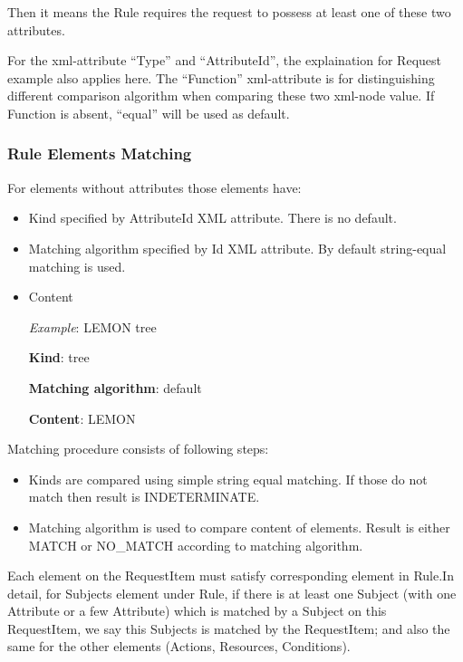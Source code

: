\documentclass{article}                            %
\begin{document}
Then it means the Rule requires the request to possess at least one of these two attributes.

For the xml-attribute ``Type'' and ``AttributeId'', the explaination for Request example also applies here.
The ``Function'' xml-attribute is for distinguishing different comparison algorithm when comparing these two xml-node value. If Function is absent, ``equal'' will be used as default.


\subsubsection{Rule Elements Matching} %
\label{subsubsec:rule_element_match}
For elements without attributes those elements have:

    \begin{itemize}
        \item Kind specified by AttributeId XML attribute. There is no default.
        \item Matching algorithm specified by Id XML attribute. By default string-equal matching is used.
        \item Content

        \textit{Example}: LEMON tree

        \textbf{Kind}: tree

        \textbf{Matching algorithm}: default

        \textbf{Content}: LEMON

    \end{itemize}

Matching procedure consists of following steps:
    \begin{itemize}
        \item Kinds are compared using simple string equal matching. If those do not match then result is INDETERMINATE.
        \item Matching algorithm is used to compare content of elements. Result is either MATCH or NO\_MATCH according to matching algorithm.
    \end{itemize}

Each element on the RequestItem must satisfy corresponding element in Rule.In detail, for Subjects element under Rule, if there is at least one Subject (with one Attribute or a few Attribute) which is matched by a Subject on this RequestItem, we say this Subjects is matched by the RequestItem; and also the same for the other elements (Actions, Resources, Conditions).
\end{document}
